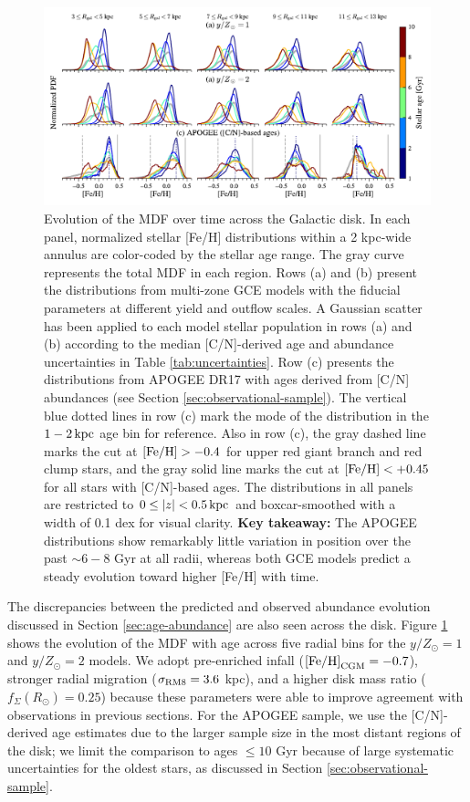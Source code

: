 \documentclass[twocolumn,twocolappendix,linenumbers]{aastex631}
\newcommand{\mathFeH}{{\rm [Fe/H]}}
\newcommand{\yZ}[1]{$y/Z_\odot=#1$}
\newcommand{\kpc}{\,{\rm kpc}}
\begin{document}
\begin{figure}
    \centering
    \includegraphics[width=\linewidth]{figures/mdf_evolution.pdf}
    \caption{Evolution of the MDF over time across the Galactic disk. In each panel, normalized stellar [Fe/H] distributions within a {2 kpc}-wide annulus are color-coded by the stellar age range. The gray curve represents the total MDF in each region. Rows (a) and (b) present the distributions from multi-zone GCE models with the fiducial parameters at different yield and outflow scales. 
    A Gaussian scatter has been applied to each model stellar population in rows (a) and (b) according to the median [C/N]-derived age and abundance uncertainties in Table \ref{tab:uncertainties}. Row (c) presents the distributions from APOGEE DR17 with ages derived from [C/N] abundances (see Section \ref{sec:observational-sample}). The vertical blue dotted lines in row (c) mark the mode of the distribution in the $1-2\kpc$ age bin for reference. Also in row (c), the gray dashed line marks the cut at $\mathFeH>-0.4$ for upper red giant branch and red clump stars, and the gray solid line marks the cut at $\mathFeH<+0.45$ for all stars with [C/N]-based ages. The distributions in all panels are restricted to $0\leq|z|<0.5\kpc$ and boxcar-smoothed with a width of {0.1 dex} for visual clarity. {\bf Key takeaway:} The APOGEE distributions show remarkably little variation in position over the past $\sim6-8$ Gyr at all radii, whereas both GCE models predict a steady evolution toward higher [Fe/H] with time.}
    \label{fig:mdf-evolution}
\end{figure}

The discrepancies between the predicted and observed abundance evolution discussed in Section \ref{sec:age-abundance} are also seen across the disk. Figure \ref{fig:mdf-evolution} shows the evolution of the MDF with age across five radial bins for the \yZ{1} and \yZ{2} models. We adopt pre-enriched infall ($\mathFeH_{\rm CGM}=-0.7$), stronger radial migration ($\sigma_{\rm RM8}=3.6$ kpc), and a higher disk mass ratio ($f_\Sigma(R_\odot)=0.25$) because these parameters were able to improve agreement with observations in previous sections. For the APOGEE sample, we use the [C/N]-derived age estimates due to the larger sample size in the most distant regions of the disk; we limit the comparison to ages $\leq10$ Gyr because of large systematic uncertainties for the oldest stars, as discussed in Section \ref{sec:observational-sample}. 
\end{document}
